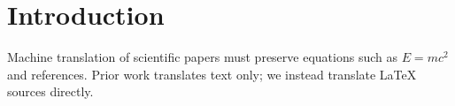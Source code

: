 \section{Introduction}\label{sec:intro}
Machine translation of scientific papers must preserve equations such as $E=mc^2$ and references.
Prior work \cite{smith2020} translates text only; we instead translate \LaTeX{} sources directly.
